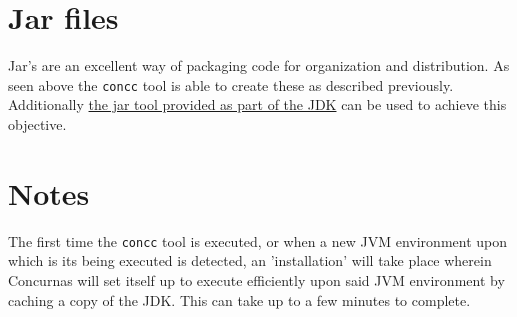 \documentclass[conc-doc]{subfiles}
\begin{document}
\section{Jar files}
Jar's are an excellent way of packaging code for organization and distribution. As seen above the \lstinline[language=None]{concc} tool is able to create these as described previously. Additionally \href{https://docs.oracle.com/javase/tutorial/deployment/jar/build.html}{the jar tool provided as part of the JDK} can be used to achieve this objective.

\section{Notes}
The first time the \lstinline[language=None]{concc} tool is executed, or when a new JVM environment upon which is its being executed is detected, an 'installation' will take place wherein Concurnas will set itself up to execute efficiently upon said JVM environment by caching a copy of the JDK. This can take up to a few minutes to complete.
\end{document}
